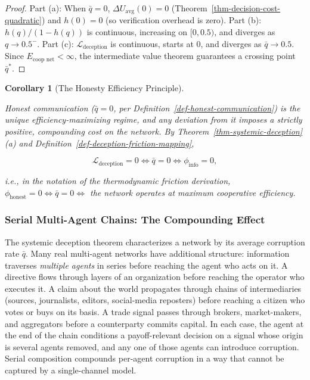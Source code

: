 \documentclass[11pt]{article}
\theoremstyle{plain}
\newtheorem{corollary}[theorem]{Corollary}
\theoremstyle{definition}
\theoremstyle{remark}
\let\origsubsubsection\subsubsection
\renewcommand{\subsubsection}{\needspace{4\baselineskip}\origsubsubsection}
\begin{document}
\begin{proof}
Part (a): When $\bar{q} = 0$, $\Delta U_{\text{avg}}(0) = 0$ (Theorem~\ref{thm-decision-cost-quadratic}) and $h(0) = 0$ (so verification overhead is zero). Part (b): $h(q)/(1 - h(q))$ is continuous, increasing on $[0, 0.5)$, and diverges as $q \to 0.5^-$. Part (c): $\mathcal{L}_{\text{deception}}$ is continuous, starts at 0, and diverges as $\bar{q} \to 0.5$. Since $E_{\text{coop net}} < \infty$, the intermediate value theorem guarantees a crossing point $\bar{q}^*$.
\end{proof}

\begin{corollary}[The Honesty Efficiency Principle]
\label{cor-honesty-efficiency}

Honest communication ($\bar{q} = 0$, per Definition~\ref{def-honest-communication}) is the unique efficiency-maximizing regime, and any deviation from it imposes a strictly positive, compounding cost on the network. By Theorem~\ref{thm-systemic-deception}(a) and Definition~\ref{def-deception-friction-mapping},

$$\mathcal{L}_{\text{deception}} = 0 \iff \bar{q} = 0 \iff \phi_{\text{info}} = 0,$$

i.e., in the notation of the thermodynamic friction derivation, $\phi_{\text{honest}} = 0 \iff \bar{q} = 0 \iff$ the network operates at maximum cooperative efficiency.
\end{corollary}

\subsubsection{Serial Multi-Agent Chains: The Compounding
Effect}\label{serial-multi-agent-chains-the-compounding-effect}

The systemic deception theorem characterizes a network by its average
corruption rate \(\bar{q}\). Many real multi-agent networks have
additional structure: information traverses \emph{multiple agents} in
series before reaching the agent who acts on it. A directive flows
through layers of an organization before reaching the operator who
executes it. A claim about the world propagates through chains of
intermediaries (sources, journalists, editors, social-media reposters)
before reaching a citizen who votes or buys on its basis. A trade signal
passes through brokers, market-makers, and aggregators before a
counterparty commits capital. In each case, the agent at the end of the
chain conditions a payoff-relevant decision on a signal whose origin is
several agents removed, and any one of those agents can introduce
corruption. Serial composition compounds per-agent corruption in a way
that cannot be captured by a single-channel model.
\end{document}
